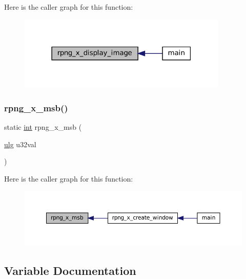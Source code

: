 Here is the caller graph for this function\+:
\nopagebreak
\begin{figure}[H]
\begin{center}
\leavevmode
\includegraphics[width=283pt]{rpng-x_8c_a764dae146d760f0ef544cde7191396ca_icgraph}
\end{center}
\end{figure}
\mbox{\label{rpng-x_8c_a1563bd7d4abbcd5bf81e60b05ca7a15b}} 
\subsubsection{\texorpdfstring{rpng\+\_\+x\+\_\+msb()}{rpng\_x\_msb()}}
{\footnotesize\ttfamily static \mbox{\hyperlink{ioapi_8h_a787fa3cf048117ba7123753c1e74fcd6}{int}} rpng\+\_\+x\+\_\+msb (\begin{DoxyParamCaption}\item[{\mbox{\hyperlink{readpng_8h_abd6f60bf9450af2ecb94097a32c19a64}{ulg}}}]{u32val }\end{DoxyParamCaption})\hspace{0.3cm}{\ttfamily [static]}}

Here is the caller graph for this function\+:
\nopagebreak
\begin{figure}[H]
\begin{center}
\leavevmode
\includegraphics[width=350pt]{rpng-x_8c_a1563bd7d4abbcd5bf81e60b05ca7a15b_icgraph}
\end{center}
\end{figure}


\subsection{Variable Documentation}
\mbox{\label{rpng-x_8c_a9db0329b02c3e8e0260939a1c680738a}} 

